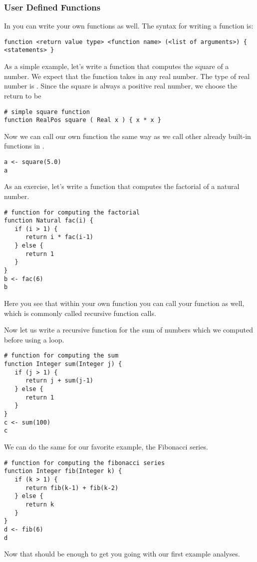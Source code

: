 \subsubsection{User Defined Functions}
In \Rev you can write your own functions as well.
The syntax for writing a function is:
{\tt \begin{snugshade*}
\begin{lstlisting}    
function <return value type> <function name> (<list of arguments>) { <statements> }
\end{lstlisting}
\end{snugshade*}}
As a simple example, let's write a function that computes the square of a number.
We expect that the function takes in any real number.
The type of real number is .
Since the square is always a positive real number, we choose the return to be 
{\tt \begin{snugshade*}
\begin{lstlisting}    
# simple square function
function RealPos square ( Real x ) { x * x }
\end{lstlisting}
\end{snugshade*}}
Now we can call our own function the same way as we call other already built-in functions in \RevBayes.
{\tt \begin{snugshade*}
\begin{lstlisting}    
a <- square(5.0)
a
\end{lstlisting}
\end{snugshade*}}
As an exercise, let's write a function that computes the factorial of a natural number.
{\tt \begin{snugshade*}
\begin{lstlisting}    
# function for computing the factorial
function Natural fac(i) {
   if (i > 1) {
      return i * fac(i-1)
   } else {
      return 1
   }
}
b <- fac(6)
b
\end{lstlisting}
\end{snugshade*}}
Here you see that within your own function you can call your function as well, which is commonly called recursive function calls.

Now let us write a recursive function for the sum of numbers which we computed before using a  loop.
{\tt \begin{snugshade*}
\begin{lstlisting}    
# function for computing the sum
function Integer sum(Integer j) {
   if (j > 1) {
      return j + sum(j-1)
   } else {
      return 1
   }
}
c <- sum(100)
c
\end{lstlisting}
\end{snugshade*}}
We can do the same for our favorite example, the Fibonacci series.
{\tt \begin{snugshade*}
\begin{lstlisting}    
# function for computing the fibonacci series
function Integer fib(Integer k) {
   if (k > 1) {
      return fib(k-1) + fib(k-2)
   } else {
      return k
   }
}
d <- fib(6)
d
\end{lstlisting}
\end{snugshade*}}
Now that should be enough to get you going with our first example analyses.




